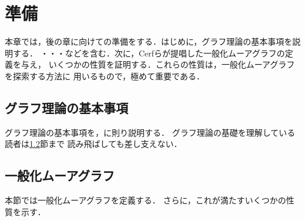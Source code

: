 
\chapter{準備}
\label{chap:preliminary}
本章では，後の章に向けての準備をする．はじめに，グラフ理論の基本事項を説明する．
・・・などを含む．次に，Cerfらが提唱した一般化ムーアグラフの定義を与え，
いくつかの性質を証明する．これらの性質は，一般化ムーアグラフを探索する方法に
用いるもので，極めて重要である．

\section{グラフ理論の基本事項}
\label{sect:basic-graph-theory}
グラフ理論の基本事項を，\cite{Diestel2000}に則り説明する．
グラフ理論の基礎を理解している読者は\ref{sect:generalized-moore-graph}節まで
読み飛ばしても差し支えない．

\section{一般化ムーアグラフ}
\label{sect:generalized-moore-graph}
本節では一般化ムーアグラフを定義する．
さらに，これが満たすいくつかの性質を示す．

